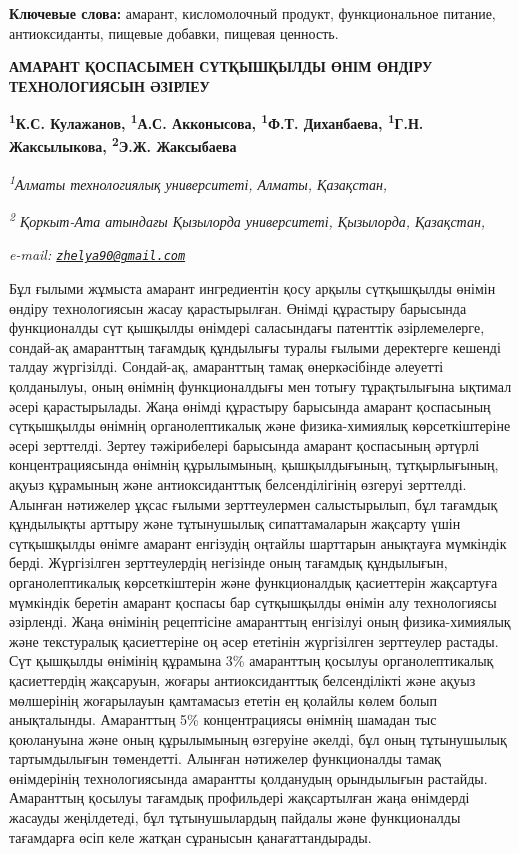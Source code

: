 {\bfseries Ключевые слова:} амарант, кисломолочный продукт, функциональное
питание, антиоксиданты, пищевые добавки, пищевая ценность.

\begin{articleheader}
{\bfseries АМАРАНТ ҚОСПАСЫМЕН СҮТҚЫШҚЫЛДЫ ӨНІМ ӨНДІРУ ТЕХНОЛОГИЯСЫН ӘЗІРЛЕУ}

{\bfseries
\textsuperscript{1}К.С. Кулажанов,
\textsuperscript{1}А.С. Акконысова\textsuperscript{\envelope },
\textsuperscript{1}Ф.Т. Диханбаева,
\textsuperscript{1}Г.Н. Жаксылыкова,
\textsuperscript{2}Э.Ж. Жаксыбаева}
\end{articleheader}

\begin{affiliation}
\emph{\textsuperscript{1}Алматы технологиялық университеті, Алматы, Қазақстан,}

\emph{\textsuperscript{2} Қоркыт-Ата атындағы Қызылорда университеті, Қызылорда, Қазақстан,}

\emph{e-mail: \href{mailto:zhelya90@gmail.com}{\nolinkurl{zhelya90@gmail.com}}}
\end{affiliation}

Бұл ғылыми жұмыста амарант ингредиентін қосу арқылы сүтқышқылды өнімін
өндіру технологиясын жасау қарастырылған. Өнімді құрастыру барысында
функционалды сүт қышқылды өнімдері саласындағы патенттік әзірлемелерге,
сондай-ақ амаранттың тағамдық құндылығы туралы ғылыми деректерге кешенді
талдау жүргізілді. Сондай-ақ, амаранттың тамақ өнеркәсібінде әлеуетті
қолданылуы, оның өнімнің функционалдығы мен тотығу тұрақтылығына ықтимал
әсері қарастырылады. Жаңа өнімді құрастыру барысында амарант қоспасының
сүтқышқылды өнімнің органолептикалық және физика-химиялық
көрсеткіштеріне әсері зерттелді. Зертеу тәжірибелері барысында амарант
қоспасының әртүрлі концентрациясында өнімнің құрылымының, қышқылдығының,
тұтқырлығының, ақуыз құрамының және антиоксиданттық белсенділігінің
өзгеруі зерттелді. Алынған нәтижелер ұқсас ғылыми зерттеулермен
салыстырылып, бұл тағамдық құндылықты арттыру және тұтынушылық
сипаттамаларын жақсарту үшін сүтқышқылды өнімге амарант енгізудің
оңтайлы шарттарын анықтауға мүмкіндік берді. Жүргізілген зерттеулердің
негізінде оның тағамдық құндылығын, органолептикалық көрсеткіштерін және
функционалдық қасиеттерін жақсартуға мүмкіндік беретін амарант қоспасы
бар сүтқышқылды өнімін алу технологиясы әзірленді. Жаңа өнімінің
рецептісіне амаранттың енгізілуі оның физика-химиялық және текстуралық
қасиеттеріне оң әсер ететінін жүргізілген зерттеулер растады. Сүт
қышқылды өнімінің құрамына 3\% амаранттың қосылуы органолептикалық
қасиеттердің жақсаруын, жоғары антиоксиданттық белсенділікті және ақуыз
мөлшерінің жоғарылауын қамтамасыз ететін ең қолайлы көлем болып
анықталынды. Амаранттың 5\% концентрациясы өнімнің шамадан тыс
қоюлануына және оның құрылымының өзгеруіне әкелді, бұл оның тұтынушылық
тартымдылығын төмендетті. Алынған нәтижелер функционалды тамақ
өнімдерінің технологиясында амарантты қолданудың орындылығын растайды.
Амаранттың қосылуы тағамдық профильдері жақсартылған жаңа өнімдерді
жасауды жеңілдетеді, бұл тұтынушылардың пайдалы және функционалды
тағамдарға өсіп келе жатқан сұранысын қанағаттандырады.


